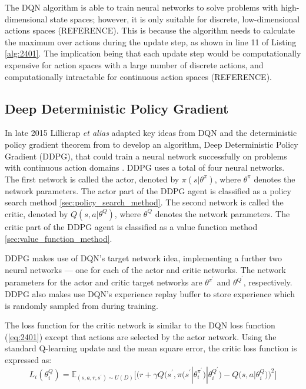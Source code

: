 The DQN algorithm is able to train neural networks to solve problems with high-dimensional state spaces; however, it is only suitable for discrete, low-dimensional actions spaces (REFERENCE). This is because the algorithm needs to calculate the maximum over actions during the update step, as shown in line 11 of Listing \ref{alg:2401}. The implication being that each update step would be computationally expensive for action spaces with a large number of discrete actions, and computationally intractable for continuous action spaces (REFERENCE).

\subsection{Deep Deterministic Policy Gradient}\label{ssec:deep_deterministic_policy_gradient}
In late 2015 Lillicrap \textit{et alias} adapted key ideas from DQN and the deterministic policy gradient theorem from \cite{Silver2014} to develop an algorithm, Deep Deterministic Policy Gradient (DDPG), that could train a neural network successfully on problems with continuous action domains \cite{Lillicrap2015}. DDPG uses a total of four neural networks. The first network is called the actor, denoted by $\pi(s|\theta^{\pi})$, where $\theta^{\pi}$ denotes the network parameters. The actor part of the DDPG agent is classified as a policy search method \ref{sec:policy_search_method}. The second network is called the critic, denoted by $Q(s,a|\theta^{Q})$, where $\theta^Q$ denotes the network parameters. The critic part of the DDPG agent is classified as a value function method \ref{sec:value_function_method}.

DDPG makes use of DQN's target network idea, implementing a further two neural networks --- one for each of the actor and critic networks. The network parameters for the actor and critic target networks are $\theta^{\pi^\prime}$ and $\theta^{Q^\prime}$, respectively. DDPG also makes use DQN's experience replay buffer to store experience which is randomly sampled from during training.

The loss function for the critic network is similar to the DQN loss function (\ref{eq:2401}) except that actions are selected by the actor network. Using the standard Q-learning update and the mean square error, the critic loss function is expressed as:
\begin{equation}
	L_i(\theta^Q_i) = \mathbb{E}_{(s,a,r,s^\prime) \sim U(D)} \bigg[ \bigg( r + \gamma Q \big(s^\prime, \pi\big(s^\prime | \theta^{\pi^\prime}_i \big) | \theta^{Q^\prime}_i \big) - Q \big(s,a | \theta^Q_i \big) \bigg)^2 \bigg]
\end{equation}\label{eq:2402}

